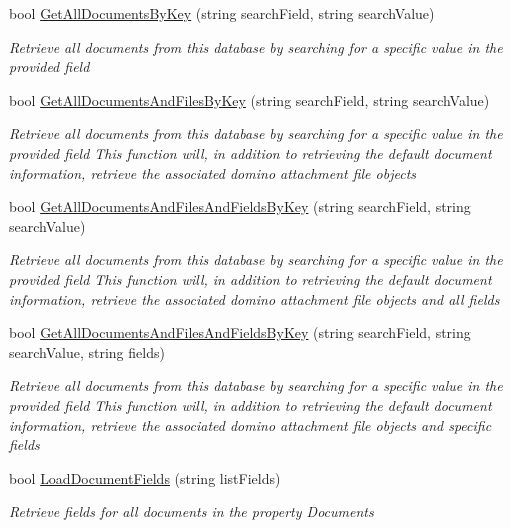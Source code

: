 \begin{DoxyCompactItemize}
bool \mbox{\hyperlink{class_database_object_ad4834e7677cd0418969a657eed99653c}{Get\+All\+Documents\+By\+Key}} (string search\+Field, string search\+Value)
\begin{DoxyCompactList}\small\item\em Retrieve all documents from this database by searching for a specific value in the provided field \end{DoxyCompactList}\item 
bool \mbox{\hyperlink{class_database_object_a6c2fb05fb6972d74d5bea67e323985fb}{Get\+All\+Documents\+And\+Files\+By\+Key}} (string search\+Field, string search\+Value)
\begin{DoxyCompactList}\small\item\em Retrieve all documents from this database by searching for a specific value in the provided field This function will, in addition to retrieving the default document information, retrieve the associated domino attachment file objects \end{DoxyCompactList}\item 
bool \mbox{\hyperlink{class_database_object_a612844c9d2bbb0b1b5013c07bf661d4a}{Get\+All\+Documents\+And\+Files\+And\+Fields\+By\+Key}} (string search\+Field, string search\+Value)
\begin{DoxyCompactList}\small\item\em Retrieve all documents from this database by searching for a specific value in the provided field This function will, in addition to retrieving the default document information, retrieve the associated domino attachment file objects and all fields \end{DoxyCompactList}\item 
bool \mbox{\hyperlink{class_database_object_a6f7a8cf66063a0b1ae67bc59f4589102}{Get\+All\+Documents\+And\+Files\+And\+Fields\+By\+Key}} (string search\+Field, string search\+Value, string fields)
\begin{DoxyCompactList}\small\item\em Retrieve all documents from this database by searching for a specific value in the provided field This function will, in addition to retrieving the default document information, retrieve the associated domino attachment file objects and specific fields \end{DoxyCompactList}\item 
bool \mbox{\hyperlink{class_database_object_a88ae0bcda671009e2742858ab945a18c}{Load\+Document\+Fields}} (string list\+Fields)
\begin{DoxyCompactList}\small\item\em Retrieve fields for all documents in the property \textquotesingle{}Documents\textquotesingle{} \end{DoxyCompactList}\item 

\end{DoxyCompactItemize}
